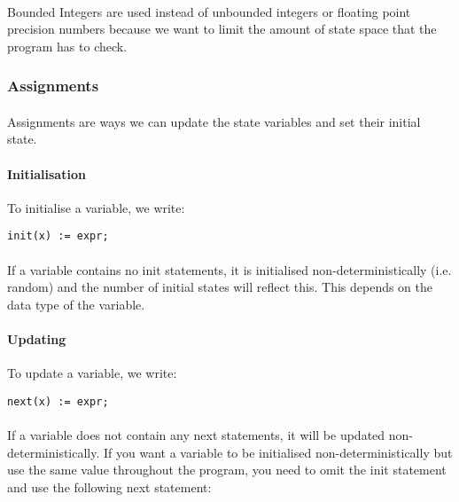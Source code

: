 \documentclass{article}
\theoremstyle{plain}
\theoremstyle{definition}
\begin{document}
\begin{multicols}{2}
\paragraph{} Bounded Integers are used instead of unbounded integers or floating point precision numbers because we want to limit the amount of state space that the program has to check.

\subsubsection{Assignments}

\paragraph{} Assignments are ways we can update the state variables and set their initial state.

\paragraph{Initialisation} To initialise a variable, we write:

\begin{lstlisting}
init(x) := expr;
\end{lstlisting}

\paragraph{} If a variable contains no init statements, it is initialised non-deterministically (i.e. random) and the number of initial states will reflect this. This depends on the data type of the variable.

\paragraph{Updating} To update a variable, we write:

\begin{lstlisting}
next(x) := expr;
\end{lstlisting}

\paragraph{} If a variable does not contain any next statements, it will be updated non-deterministically. If you want a variable to be initialised non-deterministically but use the same value throughout the program, you need to omit the init statement and use the following next statement:


\end{multicols}
\end{document}
